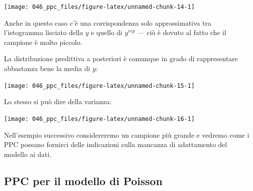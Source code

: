 \documentclass[
  11pt,
  italian,
  a4paper,
  extrafontsizes,onecolumn,openright
  ]{memoir}
\newenvironment{Shaded}{\begin{snugshade}}{\end{snugshade}}
\newcommand{\AttributeTok}[1]{\textcolor[rgb]{0.77,0.63,0.00}{#1}}
\newcommand{\DecValTok}[1]{\textcolor[rgb]{0.00,0.00,0.81}{#1}}
\newcommand{\FunctionTok}[1]{\textcolor[rgb]{0.00,0.00,0.00}{#1}}
\newcommand{\NormalTok}[1]{#1}
\newcommand{\SpecialCharTok}[1]{\textcolor[rgb]{0.00,0.00,0.00}{#1}}
\newcommand{\StringTok}[1]{\textcolor[rgb]{0.31,0.60,0.02}{#1}}
\theoremstyle{definition}
\theoremstyle{definition}
\theoremstyle{definition}
\theoremstyle{definition}
\theoremstyle{remark}
\begin{document}
\begin{Shaded}
\end{Shaded}

\begin{center}\texttt{[image: 046\_ppc\_files/figure-latex/unnamed-chunk-14-1]} \end{center}

Anche in questo caso c'è una corrispondenza solo approssimativa tra l'istogramma lisciato della \(y\) e quello di \(y^{rep}\) --- ciò è dovuto al fatto che il campione è molto piccolo.

La distribuzione predittiva a posteriori è comunque in grado di rappresentare abbastanza bene la media di \(y\):

\begin{Shaded}
\end{Shaded}

\begin{center}\texttt{[image: 046\_ppc\_files/figure-latex/unnamed-chunk-15-1]} \end{center}

\noindent
Lo stesso si può dire della varianza:

\begin{Shaded}
\end{Shaded}

\begin{center}\texttt{[image: 046\_ppc\_files/figure-latex/unnamed-chunk-16-1]} \end{center}

Nell'esempio successivo considereremo un campione più grande e vedremo come i PPC possano fornirci delle indicazioni sulla mancanza di adattamento del modello ai dati.

\hypertarget{ppc-per-il-modello-di-poisson}{%
\subsection{PPC per il modello di Poisson}\label{ppc-per-il-modello-di-poisson}}
\end{document}
